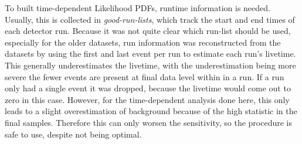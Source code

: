 To built time-dependent Likelihood PDFs, runtime information is needed.
Usually, this is collected in \emph{good-run-lists}, which track the start and end times of each detector run.
Because it was not quite clear which run-list should be used, especially for the older datasets, run information was reconstructed from the datasets by using the first and last event per run to estimate each run's livetime.
This generally underestimates the livetime, with the underestimation being more severe the fewer events are present at final data level within in a run.
If a run only had a single event it was dropped, because the livetime would come out to zero in this case.
However, for the time-dependent analysis done here, this only leads to a slight overestimation of background because of the high statistic in the final samples.
Therefore this can only worsen the sensitivity, so the procedure is safe to use, despite not being optimal.

